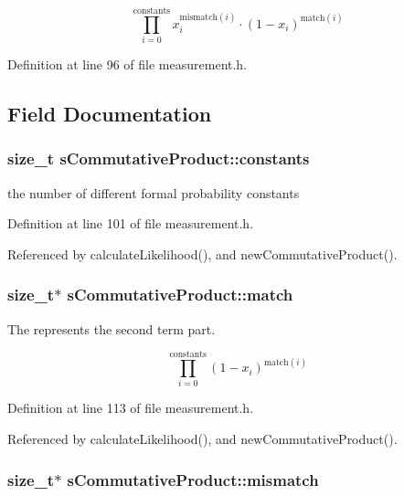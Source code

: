 \[ \prod_{i=0}^{\mathrm{constants}} x_i^{\mathrm{mismatch}(i)} \cdot (1-x_i)^{\mathrm{match}(i)} \] 

\-Definition at line 96 of file measurement.\-h.



\subsection{\-Field \-Documentation}
\hypertarget{structsCommutativeProduct_af77351b19630473b2fedc9267665032a}{
\subsubsection[{constants}]{\setlength{\rightskip}{0pt plus 5cm}size\-\_\-t {\bf s\-Commutative\-Product\-::constants}}}\label{structsCommutativeProduct_af77351b19630473b2fedc9267665032a}


the number of different formal probability constants 



\-Definition at line 101 of file measurement.\-h.



\-Referenced by calculate\-Likelihood(), and new\-Commutative\-Product().

\hypertarget{structsCommutativeProduct_ae78261dbaf0a6455774a84836fe7334d}{
\subsubsection[{match}]{\setlength{\rightskip}{0pt plus 5cm}size\-\_\-t$\ast$ {\bf s\-Commutative\-Product\-::match}}}\label{structsCommutativeProduct_ae78261dbaf0a6455774a84836fe7334d}


\-The represents the second term part. 

\[ \prod_{i=0}^{\mathrm{constants}} (1-x_i)^{\mathrm{match}(i)} \] 

\-Definition at line 113 of file measurement.\-h.



\-Referenced by calculate\-Likelihood(), and new\-Commutative\-Product().

\hypertarget{structsCommutativeProduct_a95aa7c0ea80854b88afc16d913137f35}{
\subsubsection[{mismatch}]{\setlength{\rightskip}{0pt plus 5cm}size\-\_\-t$\ast$ {\bf s\-Commutative\-Product\-::mismatch}}}\label{structsCommutativeProduct_a95aa7c0ea80854b88afc16d913137f35}


